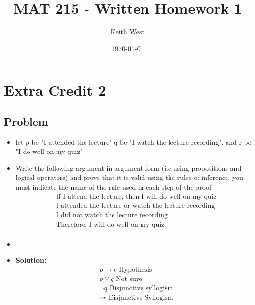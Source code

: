 \documentclass{article}
\author{Keith Wesa}
\title{MAT 215 - Written Homework 1}
\date{\today}
\begin{document}
\section*{Extra Credit 2}
\subsection*{Problem}
\begin{itemize}
    \item[] let p be "I attended the lecture" q be "I watch the lecture recording", and r be "I do well on my quiz"
    \item[] Write the following argument in argument form (i.e using propositions and logical operators) and prove 
    that it is valid using the rules of inference. you must indicate the name of the rule used in each step of the proof
    \begin{align*}
        & \text{If I attend the lecture, then I will do well on my quiz} \\
            & \text{I attended the lecture or watch the lecture recording} \\
            & \text{I did not watch the lecture recording} \\
            & \text{Therefore, I will do well on my quiz} \\
    \end{align*}
    \item[]
    \item[] \textbf{Solution:}
    \begin{align*}
        & p \to r \text{ Hypothesis} \\
        &  p \lor q \text{ Not sure} \\
        & \lnot q \text{ Disjunctive syllogism}\\
        & \therefore r \text{ Disjunctive Syllogism}\\
    \end{align*}
\end{itemize}
\end{document}
